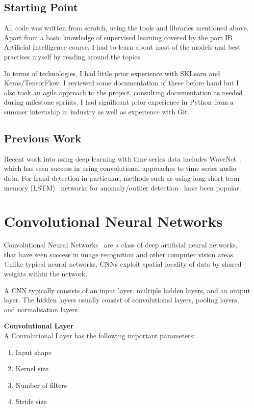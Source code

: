 \documentclass[12pt,a4paper,twoside]{report}
\begin{document}
\subsection{Starting Point}

All code was written from scratch, using the tools and libraries mentioned above. Apart from a basic knowledge of supervised learning covered by the part IB Artificial Intelligence course, I had to learn about most of the models and best practises myself by reading around the topics. 

In terms of technologies, I had little prior experience with SKLearn and Keras/TensorFlow. I reviewed some documentation of these before hand but I also took an agile approach to the project, consulting documentation as needed during milestone sprints. I had significant prior experience in Python from a summer internship in industry as well as experience with Git.

\subsection{Previous Work}
 Recent work into using deep learning with time series data includes WaveNet~\cite{DBLP:journals/corr/OordDZSVGKSK16}, which has seen success in using convolutional approaches to time series audio data. For fraud detection in particular, methods such as using long short term memory (LSTM)~\cite{Hochreiter:1997:LSM:1246443.1246450} networks for anomaly/outlier detection~\cite{malhotra2015long} have been popular.


\section{Convolutional Neural Networks}
Convolutional Neural Networks~\cite{DBLP:journals/corr/SimonyanZ14a} are a class of deep artificial neural networks, that have seen success in image recognition and other computer vision areas. Unlike typical neural networks, CNNs exploit spatial locality of data by shared weights within the network. 

A CNN typically consists of an input layer, multiple hidden layers, and an output layer. The hidden layers usually consist of convolutional layers, pooling layers, and normalisation layers. 

\textbf{Convolutional Layer}\\
A Convolutional Layer has the following important parameters: 
\begin{enumerate}
  \item Input shape
  \item Kernel size
  \item Number of filters
  \item Stride size
\end{enumerate}
\end{document}
